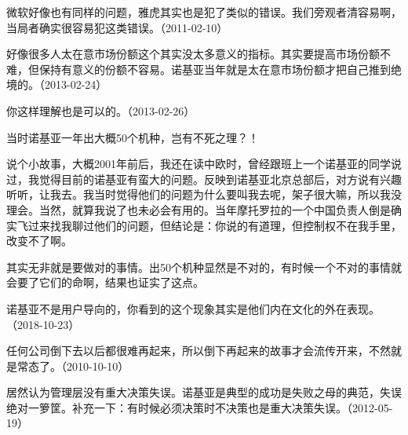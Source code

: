微软好像也有同样的问题，雅虎其实也是犯了类似的错误。我们旁观者清容易啊，当局者确实很容易犯这类错误。（2011-02-10）

好像很多人太在意市场份额这个其实没太多意义的指标。其实要提高市场份额不难，但保持有意义的份额不容易。诺基亚当年就是太在意市场份额才把自己推到绝境的。（2013-02-24）


你这样理解也是可以的。（2013-02-26）


当时诺基亚一年出大概50个机种，岂有不死之理？！

说个小故事，大概2001年前后，我还在读中欧时，曾经跟班上一个诺基亚的同学说过，我觉得目前的诺基亚有蛮大的问题。反映到诺基亚北京总部后，对方说有兴趣听听，让我去。我当时觉得他们的问题为什么要叫我去呢，架子很大嘛，所以我没理会。当然，就算我说了也未必会有用的。当年摩托罗拉的一个中国负责人倒是确实飞过来找我聊过他们的问题，但结论是：你说的有道理，但控制权不在我手里，改变不了啊。

其实无非就是要做对的事情。出50个机种显然是不对的，有时候一个不对的事情就会要了它们的命啊，结果也证实了这点。


诺基亚不是用户导向的，你看到的这个现象其实是他们内在文化的外在表现。（2018-10-23）


任何公司倒下去以后都很难再起来，所以倒下再起来的故事才会流传开来，不然就是常态了。（2010-10-10）

居然认为管理层没有重大决策失误。诺基亚是典型的成功是失败之母的典范，失误绝对一箩筐。补充一下：有时候必须决策时不决策也是重大决策失误。（2012-05-19）

